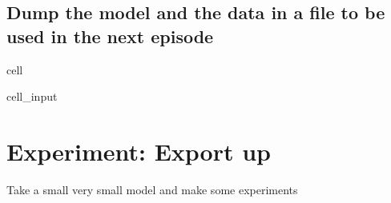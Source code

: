 \documentclass[letterpaper,10pt,english]{jupyterBook}
\begin{document}
\section{Dump the model and the data in a file to be used in the next episode}
\label{\detokenize{content/howto/smallmodel/modelstart:dump-the-model-and-the-data-in-a-file-to-be-used-in-the-next-episode}}
\begin{sphinxuseclass}{cell}\begin{sphinxVerbatimInput}

\begin{sphinxuseclass}{cell_input}
\begin{sphinxVerbatim}[commandchars=\\\{\}]
\end{sphinxVerbatim}

\end{sphinxuseclass}\end{sphinxVerbatimInput}

\end{sphinxuseclass}
\sphinxstepscope


\chapter{Experiment: Export up}
\label{\detokenize{content/howto/smallmodel/modelstart export up:experiment-export-up}}\label{\detokenize{content/howto/smallmodel/modelstart export up::doc}}
\sphinxAtStartPar
Take a small very small model and make some experiments
\end{document}
